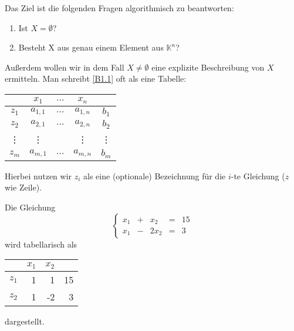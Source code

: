Das Ziel ist die folgenden Fragen algorithmisch zu beantworten:
\begin{enumerate}
	\item
		Ist $ X = \emptyset $?
	\item
		Besteht X aus genau einem Element aus $ \mathbb{K}^n $?
\end{enumerate}
Außerdem wollen wir in dem Fall $ X \neq \emptyset $ eine explizite Beschreibung von $ X $ ermitteln. Man schreibt \eqref{B1.1} oft als eine Tabelle:
\begin{center}
\begin{tabular}{c|ccc|c}
	& $ x_1 $ & $ \ldots $ & $ x_n $ & \\
	\hline
	$ z_1 $ & $ a_{1,1} $ & $ \ldots $ & $ a_{1,n} $ & $ b_1 $ \\
	$ z_2 $ & $ a_{2,1} $ & $ \ldots $ & $ a_{2,n} $ & $ b_2 $ \\
	\vdots & \vdots &  & \vdots & \vdots \\
	$ z_m $ & $ a_{m,1} $ & $ \ldots $ & $ a_{m,n} $ & $ b_m $ \\
	\hline
\end{tabular}
\end{center}
Hierbei nutzen wir $ z_i $ als eine (optionale) Bezeichnung für die $ i $-te Gleichung ($ z $ wie Zeile). 

\begin{bsp}
	Die Gleichung 
	\[
		 \left\{ \begin{array}{rcrcr}
		x_1 &+& x_2 &=& 15\\
		x_1 &-& 2x_2 &=& 3
	\end{array} \right. 
	\]
	wird tabellarisch als 
	\begin{center}
	\begin{tabular}{r|rr|r}
		& $ x_1 $ & $ x_2 $ & \\
		\hline
		$ z_1 $ & 1 & 1 & 15 \\
		$ z_2 $ & 1 & -2 & 3 \\
		\hline
	\end{tabular}
	\end{center} 
	dargestellt. 
\end{bsp}
 

